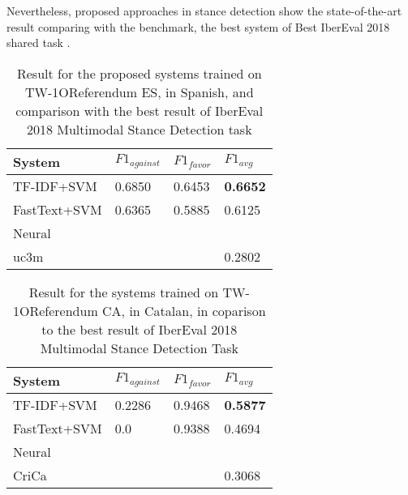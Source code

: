 \documentclass[10pt, a4paper]{article}
\begin{document}
Nevertheless, proposed approaches in stance detection show the state-of-the-art result comparing with the benchmark, the best system of Best IberEval 2018 shared task \cite{Segura-Bedmar18,taule18}. 

\begin{table}[!h]
\begin{center}
\begin{tabularx}{\columnwidth}{|l|l|l|X|}

\hline
System &$F1_{against}$&$F1_{favor}$&$F1_{avg}$\\ 
\hline
TF-IDF+SVM &0.6850& 0.6453&\textbf{0.6652}\\ 
\hline
FastText+SVM&0.6365&0.5885&0.6125\\ 
\hline
Neural     & &   &  \\
\hline
uc3m&  & &0.2802\\ 
\hline

\end{tabularx}
\caption{Result for the proposed systems trained on TW-1OReferendum ES, in Spanish, and comparison with the best result of IberEval 2018 Multimodal Stance Detection task}
    \end{center}
    \label{tab:result_tw1o_es}
\end{table}

\begin{table}[!h]
\begin{center}
\begin{tabularx}{\columnwidth}{|l|l|l|X|}
\hline
System & $F1_{against}$ & $F1_{favor}$ &$F1_{avg}$\\
\hline
TF-IDF+SVM & 0.2286& 0.9468& \textbf{0.5877} \\
\hline
FastText+SVM& 0.0 & 0.9388&0.4694 \\
\hline
Neural      &   &  &\\ 
\hline
CriCa  &    &   &0.3068 \\ 
\hline

\end{tabularx}
\caption{Result for the systems trained on TW-1OReferendum CA, in Catalan, in coparison to the best result of IberEval 2018 Multimodal Stance Detection Task}
\end{center}
\label{tab:result_tw1o_ca}
\end{table}




\end{document}
